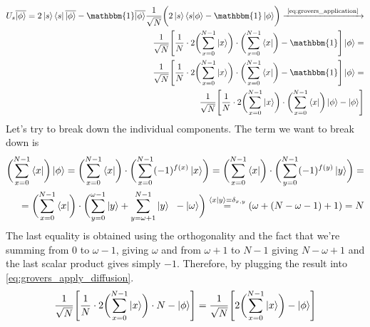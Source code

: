 \begin{equation}
  \begin{split}
    U_s \overline{\ket{\phi}} = 2\ket{s}\bra{s} \overline{\ket{\phi}} - \mathbbm{1}\overline{\ket{\phi}} 
    \frac{1}{\sqrt{N}}\biggl(2\ket{s}\bra{s} \ket{\phi} - \mathbbm{1}\ket{\phi}\biggr) \xrightarrow{\text{ \autoref{eq:grovers_application} }} \\
    \frac{1}{\sqrt{N}}\Biggl[\frac{1}{N}\cdot 2\biggl( \sum_{x=0}^{N-1}\ket{x} \biggr)\cdot \biggl( \sum_{x=0}^{N-1} \bra{x}  \biggr) - \mathbbm{1} \Biggr] \ket{\phi} = \\
    \frac{1}{\sqrt{N}}\Biggl[\frac{1}{N}\cdot 2\biggl( \sum_{x=0}^{N-1}\ket{x} \biggr)\cdot \biggl( \sum_{x=0}^{N-1} \bra{x} \biggr) - \mathbbm{1} \Biggr] \ket{\phi} = \\
    \frac{1}{\sqrt{N}}\Biggl[\frac{1}{N}\cdot 2 \biggl( \sum_{x=0}^{N-1}\ket{x}\biggr)\cdot \biggl( \sum_{x=0}^{N-1} \bra{x} \biggr)\ket{\phi} - \ket{\phi }\Biggr]  
  \end{split}
  \label{eq:grovers_apply_diffusion}
\end{equation}
Let's try to break down the individual components.
The term we want to break down is 
\begin{equation}
\begin{split}
  \biggl( \sum_{x=0}^{N-1} \bra{x} \biggr)\ket{\phi} = \biggl( \sum_{x=0}^{N-1} \bra{x} \biggr)\cdot \biggl( \sum_{x=0}^{N-1}(-1)^{f(x)}\ket{x} \biggr) = \biggl( \sum_{x=0}^{N-1} \bra{x} \biggr)\cdot \biggl( \sum_{y=0}^{N-1}(-1)^{f(y)}\ket{y} \biggr) = \\ 
 = \biggl( \sum_{x=0}^{N-1} \bra{x} \biggr)\cdot \biggl(\sum_{y=0}^{\omega - 1} \ket{y}  
 + \sum_{y=\omega+1}^{N-1} \ket{y} \; \; - \ket{\omega} \biggr) \stackrel{\bra{x}\ket{y} = \delta_{x,y}}{=} (\omega + (N-\omega -1)+1) = N
\end{split}
\end{equation}
The last equality is obtained using the orthogonality and the fact that we're summing from $0$ to $\omega -1$, giving $\omega$ and from $\omega+1$ to $N-1$ giving $N-\omega+1$ 
and the last scalar product gives simply $-1$. Therefore, by plugging the result into \autoref{eq:grovers_apply_diffusion}.
\begin{equation}
  \begin{split}
    \frac{1}{\sqrt{N}}\Biggl[\frac{1}{N}\cdot 2 \biggl( \sum_{x=0}^{N-1}\ket{x}\biggr)\cdot N - \ket{\phi }\Biggr] = \frac{1}{\sqrt{N}}\Biggl[2\biggl( \sum_{x=0}^{N-1}\ket{x}\biggr) - \ket{\phi }\Biggr] 
  \end{split}
\end{equation}
